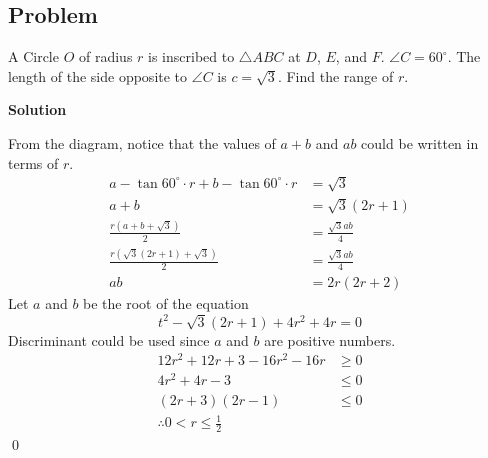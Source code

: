 \documentclass{article}
\newenvironment{solution}{\begin{trivlist}\item[]{\bf Solution}}{\qed \end{trivlist}}
\begin{document}
\subsection*{Problem}
A Circle $O$ of radius $r$ is inscribed to $\triangle{ABC}$
at $D$, $E$, and $F$. $\angle{C} = 60^\circ$. The length
of the side opposite to $\angle{C}$ is $c = \sqrt{3}$.
Find the range of $r$.
\begin{solution}
\begin{center}
\end{center}
From the diagram, notice that the values of $a + b$
and $ab$ could be written in terms of $r$.
\begin{align*}
    a - \tan60^\circ \cdot r + b - \tan60^\circ \cdot r
    &= \sqrt{3} \\
    a + b
    &= \sqrt{3}(2r + 1) \\
    \frac{r(a + b + \sqrt{3})}{2}
    &= \frac{\sqrt{3}ab}{4} \\
    \frac{r\left( \sqrt{3}(2r + 1) + \sqrt{3} \right)}{2}
    &= \frac{\sqrt{3}ab}{4} \\
    ab &= 2r(2r + 2)
\end{align*}
Let $a$ and $b$ be the root of the equation
\[
t^2 - \sqrt{3}(2r + 1) + 4r^2 + 4r = 0
\]
Discriminant could be used since $a$ and $b$
are positive numbers.
\begin{align*}
    12r^2 + 12r + 3 - 16r^2 - 16r &\geq 0 \\
    4r^2 + 4r - 3 &\leq 0 \\
    (2r + 3)(2r - 1) &\leq 0 \\
    \therefore \boxed{0 < r \leq \frac{1}{2}}
\end{align*}
\end{solution}
\end{document}
